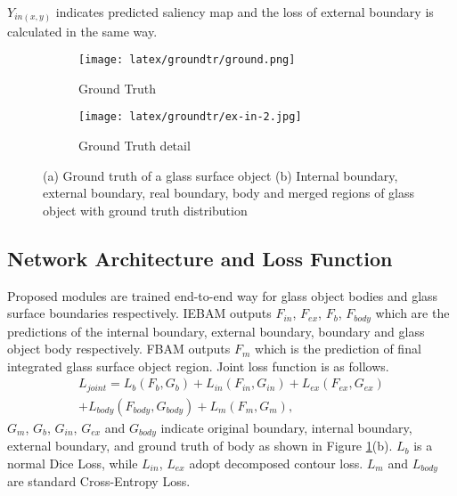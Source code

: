 \documentclass[10pt,twocolumn,letterpaper]{article}
\begin{document}
${\textit{Y}}_{in(x,y)}$ indicates predicted saliency map and the loss of external boundary is calculated in the same way. %
\begin{figure}[!b]
\centering
   \begin{subfigure}[t]{0.3\linewidth}\texttt{[image: latex/groundtr/ground.png]}\caption{Ground Truth}\end{subfigure}
    \begin{subfigure}[t]{0.67\linewidth}\texttt{[image: latex/groundtr/ex-in-2.jpg]}\caption{Ground Truth detail}\end{subfigure}
    \caption{(a) Ground truth of a glass surface object (b) Internal boundary, external boundary, real boundary, body and merged regions of glass object with ground truth distribution}
    \label{gth detail}
\end{figure}
\subsection{Network Architecture and Loss Function}
Proposed modules are trained end-to-end way for glass object bodies and glass surface boundaries respectively. IEBAM outputs ${\textit{F}}_{in}$, ${\textit{F}}_{ex}$, ${\textit{F}}_{b}$, ${\textit{F}}_{body}$ which are the predictions of the internal boundary, external boundary, boundary and glass object body respectively. FBAM outputs ${\textit{F}}_{m}$ which is the prediction of final integrated glass surface object region. Joint loss function is as follows.
\begin{multline}
\label{eqn:05}
{\textit{L}}_{joint}={\textit{L}}_{b}({\textit{F}}_{b},{\textit{G}}_{b})+{\textit{L}}_{in}({\textit{F}}_{in},{\textit{G}}_{in})+{\textit{L}}_{ex}({\textit{F}}_{ex},{\textit{G}}_{ex})\\ +{\textit{L}}_{body}({\textit{F}}_{body},{\textit{G}}_{body})+{\textit{L}}_{m}({\textit{F}}_{m},{\textit{G}}_{m}),
\end{multline}
${\textit{G}}_{m}$, ${\textit{G}}_{b}$, ${\textit{G}}_{in}$, ${\textit{G}}_{ex}$ and ${\textit{G}}_{body}$ indicate original boundary, internal boundary, external boundary, and ground truth of body as shown in Figure \ref{gth detail}(b). ${\textit{L}}_{b}$ is a normal Dice Loss\cite{milletari2016v}, while ${\textit{L}}_{in}$, ${\textit{L}}_{ex}$ adopt decomposed contour loss. ${\textit{L}}_{m}$ and ${\textit{L}}_{body}$ are standard Cross-Entropy Loss.
\end{document}
